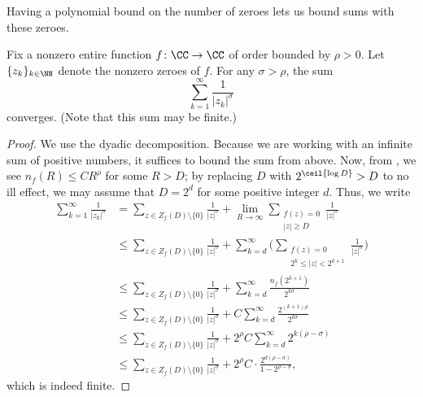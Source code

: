 \documentclass[notes.tex]{subfiles}
\begin{document}
Having a polynomial bound on the number of zeroes lets us bound sums with these zeroes.
\begin{corollary} \label{cor:bound-sum-of-zeroes}
	Fix a nonzero entire function $f\colon\CC\to\CC$ of order bounded by $\rho>0$. Let $\{z_k\}_{k\in\NN}$ denote the nonzero zeroes of $f$. For any $\sigma>\rho$, the sum
	\[\sum_{k=1}^\infty\frac1{|z_k|^\sigma}\]
	converges. (Note that this sum may be finite.)
\end{corollary}
\begin{proof}
	We use the dyadic decomposition. Because we are working with an infinite sum of positive numbers, it suffices to bound the sum from above. Now, from , we see $n_f(R)\le CR^\rho$ for some $R>D$; by replacing $D$ with $2^{\ceil{\log D}}>D$ to no ill effect, we may assume that $D=2^d$ for some positive integer $d$. Thus, we write
	\begin{align*}
		\sum_{k=1}^\infty\frac1{|z_k|^\sigma} &= \sum_{z\in Z_f(D)\setminus\{0\}}\frac1{|z|^\sigma}+\lim_{R\to\infty}\sum_{\substack{f(z)=0\\|z|\ge D}}\frac1{|z|^\sigma} \\
		&\le \sum_{z\in Z_f(D)\setminus\{0\}}\frac1{|z|^\sigma}+\sum_{k=d}^\infty\Bigg(\sum_{\substack{f(z)=0\\2^k\le|z|<2^{k+1}}}\frac1{|z|^\sigma}\Bigg) \\
		&\le \sum_{z\in Z_f(D)\setminus\{0\}}\frac1{|z|^\sigma}+\sum_{k=d}^\infty\frac{n_f\left(2^{k+1}\right)}{2^{k\sigma}} \\
		&\le \sum_{z\in Z_f(D)\setminus\{0\}}\frac1{|z|^\sigma}+C\sum_{k=d}^\infty\frac{2^{(k+1)\rho}}{2^{k\sigma}} \\
		&\le \sum_{z\in Z_f(D)\setminus\{0\}}\frac1{|z|^\sigma}+2^\rho C\sum_{k=d}^\infty2^{k(\rho-\sigma)} \\
		&\le \sum_{z\in Z_f(D)\setminus\{0\}}\frac1{|z|^\sigma}+2^\rho C\cdot\frac{2^{d(\rho-\sigma)}}{1-2^{\rho-\sigma}},
	\end{align*}
	which is indeed finite.
\end{proof}
\end{document}
